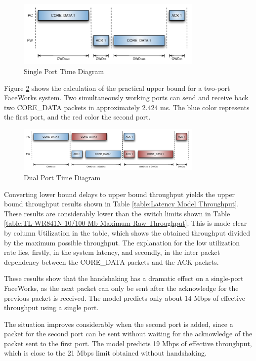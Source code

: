 \documentclass[conference]{IEEEtran}
\begin{document}
\begin{figure}[h]
  \centering
      \includegraphics[width=9cm,center]{Diagrams/Single-time.pdf}
  \caption{Single Port Time Diagram}\label{fig:singleport}
\end{figure}

Figure \ref{fig:dualport} shows the calculation of the practical upper bound for a two-port FaceWorks system. Two simultaneously working ports can send and receive back two CORE\_DATA packets in approximately 2.424 ms. The blue color represents the first port, and the red color the second port.

\begin{figure}[h]
  \centering
      \includegraphics[width=9cm,center]{Diagrams/Dual-time.pdf}
  \caption{Dual Port Time Diagram}\label{fig:dualport}
\end{figure}



Converting lower bound delays to upper bound throughput yields the upper bound throughput results shown in Table \ref{table:Latency Model Throughput}. These results are considerably lower than the switch limits shown in Table \ref{table:TL-WR841N 10/100 Mb Maximum Raw Throughput}. This is made clear by column Utilization in the table, which shows the obtained throughput divided by the maximum possible throughput.  The explanation for the low utilization rate lies, firstly, in the system latency, and secondly, in the inter packet dependency between the CORE\_DATA packets and the ACK packets.

These results show that the handshaking has a dramatic effect on a single-port FaceWorks, as the next packet can only be sent after the acknowledge for the previous packet is received. The model predicts only about 14 Mbps of effective throughput using a single port.

The situation improves considerably when the second port is added, since a packet for the second port
can be sent without waiting for the acknowledge of the packet sent to the first port. The model
predicts 19 Mbps of effective throughput, which is close to the 21 Mbps limit obtained without handshaking.
\end{document}
